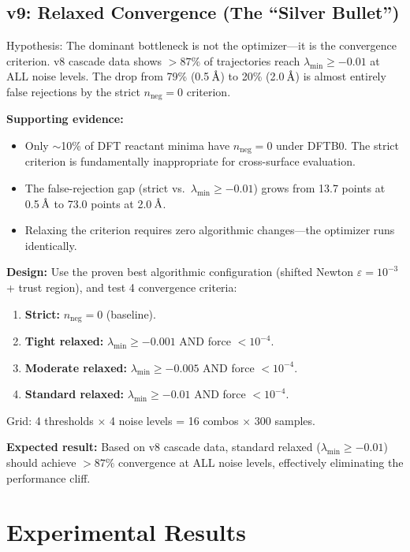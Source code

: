\documentclass[11pt,a4paper]{article}
\newcommand{\angstrom}{\text{\r{A}}}
\begin{document}
\subsection{v9: Relaxed Convergence (The ``Silver Bullet'')}

Hypothesis: The dominant bottleneck is not the optimizer---it is the convergence criterion. v8 cascade data shows $>87\%$ of trajectories reach $\lambda_\text{min} \geq -0.01$ at ALL noise levels. The drop from 79\% (0.5\,$\angstrom$) to 20\% (2.0\,$\angstrom$) is almost entirely false rejections by the strict $n_\text{neg} = 0$ criterion.

\textbf{Supporting evidence:}
\begin{itemize}
  \item Only $\sim$10\% of DFT reactant minima have $n_\text{neg} = 0$ under DFTB0. The strict criterion is fundamentally inappropriate for cross-surface evaluation.
  \item The false-rejection gap (strict vs.\ $\lambda_\text{min} \geq -0.01$) grows from 13.7 points at 0.5\,$\angstrom$ to 73.0 points at 2.0\,$\angstrom$.
  \item Relaxing the criterion requires zero algorithmic changes---the optimizer runs identically.
\end{itemize}

\textbf{Design:} Use the proven best algorithmic configuration (shifted Newton $\varepsilon = 10^{-3}$ + trust region), and test 4 convergence criteria:
\begin{enumerate}
  \item \textbf{Strict:} $n_\text{neg} = 0$ (baseline).
  \item \textbf{Tight relaxed:} $\lambda_\text{min} \geq -0.001$ AND force $< 10^{-4}$.
  \item \textbf{Moderate relaxed:} $\lambda_\text{min} \geq -0.005$ AND force $< 10^{-4}$.
  \item \textbf{Standard relaxed:} $\lambda_\text{min} \geq -0.01$ AND force $< 10^{-4}$.
\end{enumerate}
Grid: 4 thresholds $\times$ 4 noise levels = 16 combos $\times$ 300 samples.

\textbf{Expected result:} Based on v8 cascade data, standard relaxed ($\lambda_\text{min} \geq -0.01$) should achieve $>87\%$ convergence at ALL noise levels, effectively eliminating the performance cliff.

\section{Experimental Results}
\label{sec:results}
\end{document}
